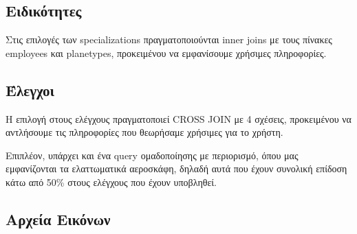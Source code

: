 \documentclass[a4paper]{article}
\begin{document}
\subsection{Ειδικότητες}
Στις επιλογές των specializations πραγματοποιούνται inner joins με τους
πίνακες employees και planetypes, προκειμένου να εμφανίσουμε χρήσιμες
πληροφορίες.
    
\subsection{Έλεγχοι}
	Η επιλογή στους ελέγχους πραγματοποιεί CROSS JOIN με 4 σχέσεις, προκειμένου
	να αντλήσουμε τις πληροφορίες που θεωρήσαμε χρήσιμες για το χρήστη.

	Επιπλέον, υπάρχει και ένα query ομαδοποίησης με περιορισμό, όπου μας
	εμφανίζονται τα ελαττωματικά αεροσκάφη, δηλαδή αυτά που έχουν συνολική
	επίδοση κάτω από 50\% στους ελέγχους που έχουν υποβληθεί.

\subsection{Αρχεία Εικόνων}
    

\end{document}
